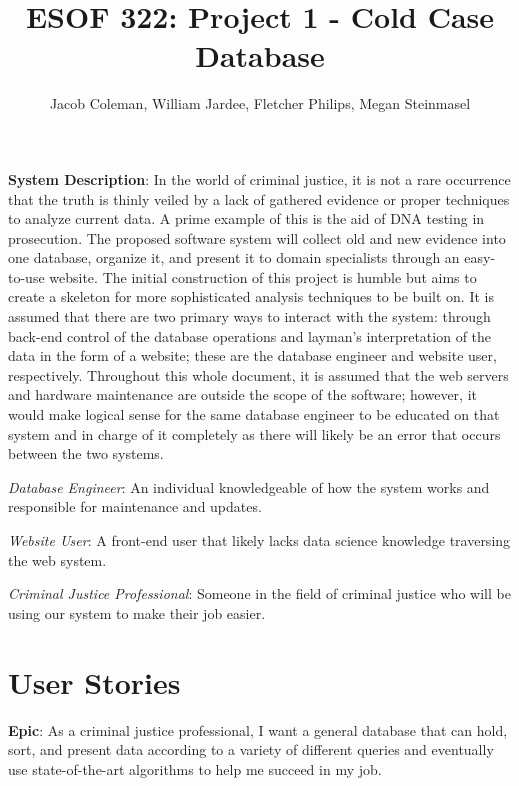 \documentclass[11pt]{article}
\begin{document}
\title{ESOF 322: Project 1 - Cold Case Database}
\author{Jacob Coleman, William Jardee, Fletcher Philips, Megan Steinmasel}
\maketitle



\textbf{System Description}: In the world of criminal justice, it is not a rare occurrence that the truth is thinly veiled by a lack of gathered evidence or proper techniques to analyze current data. A prime example of this is the aid of DNA testing in prosecution. The proposed software system will collect old and new evidence into one database, organize it, and present it to domain specialists through an easy-to-use website. The initial construction of this project is humble but aims to create a skeleton for more sophisticated analysis techniques to be built on. It is assumed that there are two primary ways to interact with the system: through back-end control of the database operations and layman's interpretation of the data in the form of a website; these are the database engineer and website user, respectively. Throughout this whole document, it is assumed that the web servers and hardware maintenance are outside the scope of the software; however, it would make logical sense for the same database engineer to be educated on that system and in charge of it completely as there will likely be an error that occurs between the two systems. \vspace{1.5em}

\textit{Database Engineer}: An individual knowledgeable of how the system works and responsible for maintenance and updates.\vspace{0.5em}

\textit{Website  User}: A front-end user that likely lacks data science knowledge traversing the web system.\vspace{0.5em}

\textit{Criminal Justice Professional}: Someone in the field of criminal justice who will be using our system to make their job easier.
\vspace{1.5em}


\section*{User Stories}

\noindent\textbf{Epic}: As a criminal justice professional, I want a general database that can hold, sort, and present data according to a variety of different queries and eventually use state-of-the-art algorithms to help me succeed in my job.\vspace{0.5em}
\end{document}
